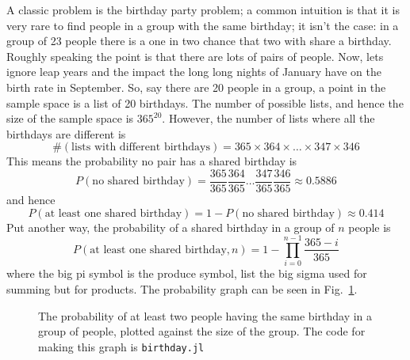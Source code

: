 \documentclass[11pt,a4paper]{scrartcl}
\begin{document}
A classic problem is the birthday party problem; a common intuition is
that it is very rare to find people in a group with the same birthday;
it isn't the case: in a group of 23 people there is a one in two
chance that two with share a birthday. Roughly speaking the point is that
there are lots of pairs of people. Now, lets ignore leap years and the
impact the long long nights of January have on the birth rate in
September. So, say there are 20 people in a
group, a point in the sample space is a list of 20 birthdays. The
number of possible lists, and hence the size of the sample space is
$365^{20}$. However, the number of lists where all the birthdays are
different is
\begin{equation}
\#(\mbox{lists with different birthdays})=365\times 364 \times \ldots \times 347 \times 346
\end{equation}
This means the probability no pair has a shared birthday is
\begin{equation}
P(\mbox{no shared birthday})=\frac{365}{365}\frac{364}{365}\ldots\frac{347}{365}\frac{346}{365}\approx 0.5886
\end{equation}
and hence
\begin{equation}
P(\mbox{at least one shared birthday})=1-P(\mbox{no shared birthday})\approx 0.414
\end{equation}
Put another way, the probability of a shared birthday in a group of $n$ people is
\begin{equation}
P(\mbox{at least one shared birthday},n)=1-\prod_{i=0}^{n-1}\frac{365-i}{365}
\end{equation}
where the big pi symbol is the produce symbol, list the big sigma used
for summing but for products. The probability graph can be seen in Fig.~\ref{fig_birthday}.


\begin{figure}[thb]
\begin{center}

\end{center}
\caption{The probability of at least two people having the same birthday in a group of people, plotted against the size of the group. The code for making this graph is \texttt{birthday.jl}\label{fig_birthday}}
\end{figure}
\end{document}
